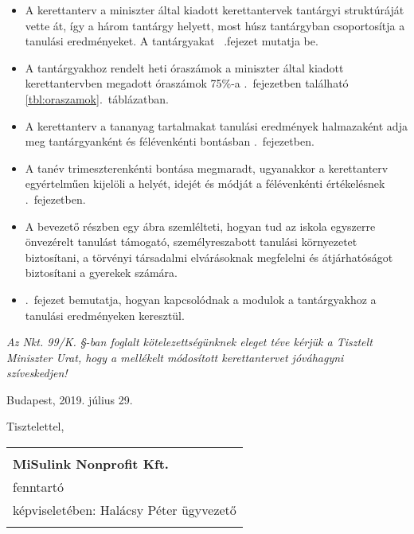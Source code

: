 \begin{itemize}
      \item A kerettanterv a miniszter által kiadott kerettantervek tantárgyi struktúráját vette át, így a három tantárgy helyett, most húsz tantárgyban csoportosítja a tanulási eredményeket. A tantárgyakat ~.fejezet mutatja be.
      \item A tantárgyakhoz rendelt heti óraszámok a miniszter által kiadott kerettantervben megadott óraszámok 75\%-a .~fejezetben található \ref{tbl:oraszamok}.~táblázatban.
      \item A kerettanterv a tananyag tartalmakat tanulási eredmények halmazaként adja meg tantárgyanként és félévenkénti bontásban .~fejezetben.
      \item A tanév trimeszterenkénti bontása megmaradt, ugyanakkor a kerettanterv egyértelműen kijelöli a helyét, idejét és módját a félévenkénti értékelésnek .~fejezetben.
      \item A bevezető részben egy ábra szemlélteti, hogyan tud az iskola egyszerre önvezérelt tanulást támogató, személyreszabott tanulási környezetet biztosítani, a törvényi társadalmi elvárásoknak megfelelni és átjárhatóságot biztosítani a gyerekek számára.
      \item {}.~fejezet bemutatja, hogyan kapcsolódnak a modulok a tantárgyakhoz a tanulási eredményeken keresztül.
\end{itemize}


\noindent
\emph{Az Nkt. 99/K. §-ban foglalt kötelezettségünknek eleget téve kérjük a Tisztelt Miniszter Urat, hogy a mellékelt módosított kerettantervet jóváhagyni szíveskedjen!}

\vspace{0.75cm}

\noindent
Budapest, 2019. július 29.

\vspace{0.75cm}
\noindent
Tisztelettel,

\vspace{0.75cm}
\noindent
\begin{center}
      \begin{tabular}{p{8cm}}
            \begin{center}
                  \hrulefill \\
                  \textbf{MiSulink Nonprofit Kft.} \\
                  fenntartó\\
                  képviseletében: Halácsy Péter ügyvezető \\
            \end{center}
      \end{tabular}
\end{center}
\newpage